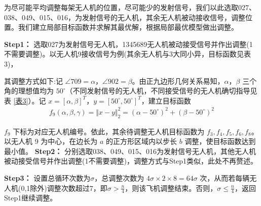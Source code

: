 \documentclass[withoutpreface,bwprint]{cumcmthesis} %
\begin{document}
    为尽可能平均调整每架无人机的位置，尽可能少的发射信号，我们以此选取027、038、049、015、016，为发射信号的无人机，其余无人机被动接收信号，调整位置。我们建立局部目标函数并求解其最优解，根据局部最优模型做出调整。

    \textbf{Step1：} 选取027为发射信号无人机，1345689无人机被动接受信号并作出调整(1不需要调整)。以无人机9接收信号为例(其余无人机与3大同小异，目标函数见表3)，
     
    其调整方式如下:记 $\angle 709 = \alpha$，$\angle 902 = \beta$。由正九边形几何关系易知，$\alpha$，$\beta$ 三个角的理想值均为 $50^\circ$（不同发射信号的无人机，不同接受信号的无人机确切指导见表 \ref{表3}）。记 $x = [\alpha, \beta]^T$，$y = [50^\circ, 50^\circ]^T$，建立目标函数
    \begin{align}
        f_9(\alpha, \beta, \gamma) = \Vert{x} - {y}\Vert_2^2 = (\alpha - 50^\circ)^2 + (\beta - 50^\circ)^2
    \end{align}

    $f_9$ 下标为对应无人机编号。依此，其余待调整无人机目标函数为 $f_3, f_4, f_5, f_6, f_8$。以无人机 9 为中心，在边长为 $a$ 的正方形区域内以步长 $b$ 调整，使目标函数达到最小值。
    \textbf{Step2：} 分别选取038、049、015、016为发射信号无人机，其他无人机被动接受信号并作出调整(1不需要调整)，调整方式与Step1类似，此处不再赘述。

    \textbf{Step3：} 设置总循环次数为$\sigma$，总调整次数为 $4\sigma \times 2 \times 8 = 64\sigma$ 次，从而若每辆无人机(0,1除外)调整次数超过7，即$\sigma>\frac{n}{4}$，则该飞机调整结束。否则，$\sigma \leq\frac{n}{4}$，返回Step1继续调整。
\end{document}
